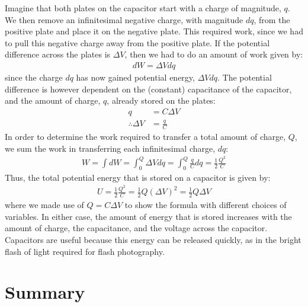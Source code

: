 Imagine that both plates on the capacitor start with a charge of magnitude, $q$. We then remove an infinitesimal negative charge, with magnitude $dq$, from the positive plate and place it on the negative plate. This required work, since we had to pull this negative charge away from the positive plate. If the potential difference across the plates is $\Delta V$, then we had to do an amount of work given by:
\begin{align*}
dW = \Delta Vdq
\end{align*}
since the charge $dq$ has now gained potential energy, $\Delta Vdq$. The potential difference is however dependent on the (constant) capacitance of the capacitor, and the amount of charge, $q$, already stored on the plates:
\begin{align*}
q &= C\Delta V\\
\therefore \Delta V&=\frac{q}{C}
\end{align*}
In order to determine the work required to transfer a total amount of charge, $Q$, we sum the work in transferring each infinitesimal charge, $dq$:
\begin{align*}
W=\int dW=\int_0^Q \Delta Vdq=\int_0^Q \frac{q}{C}dq=\frac{1}{2}\frac{Q^2}{C}
\end{align*}
Thus, the total potential energy that is stored on a capacitor is given by:
\begin{align*}
U = \frac{1}{2}\frac{Q^2}{C} = \frac{1}{2}Q(\Delta V)^2=\frac{1}{2}Q\Delta V
\end{align*}
where we made use of $Q=C\Delta V$ to show the formula with different choices of variables. In either case, the amount of energy that is stored increases with the amount of charge, the capacitance, and the voltage across the capacitor. Capacitors are useful because this energy can be released quickly, as in the bright flash of light required for flash photography.

\newpage
\section{Summary}


